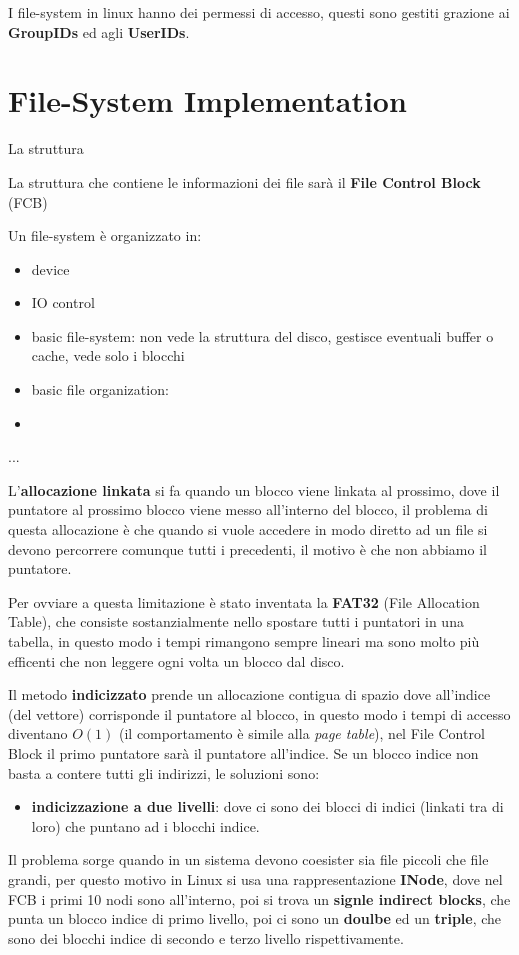 \documentclass[12pt]{article}
\begin{document}
I file-system in linux hanno dei permessi di accesso, questi sono gestiti grazione ai \textbf{GroupIDs} ed agli \textbf{UserIDs}.


\newpage
\section{File-System Implementation}
La struttura

La struttura che contiene le informazioni dei file sar\`a il \textbf{File Control Block} (FCB)

Un file-system \`e organizzato in:
\begin{itemize}
  \item device
  \item IO control
  \item basic file-system: non vede la struttura del disco, gestisce eventuali buffer o cache, vede solo i blocchi
  \item basic file organization: 
  \item 
\end{itemize}
...

L'\textbf{allocazione linkata} si fa quando un blocco viene linkata al prossimo, dove il puntatore al prossimo blocco viene messo all'interno del blocco, il problema di questa allocazione \`e che quando si vuole accedere in modo diretto ad un file si devono percorrere comunque tutti i precedenti, il motivo \`e che non abbiamo il puntatore.

Per ovviare a questa limitazione \`e stato inventata la \textbf{FAT32} (File Allocation Table), che consiste sostanzialmente nello spostare tutti i puntatori in una tabella, in questo modo i tempi rimangono sempre lineari ma sono molto pi\`u efficenti che non leggere ogni volta un blocco dal disco.

Il metodo \textbf{indicizzato} prende un allocazione contigua di spazio dove all'indice (del vettore) corrisponde il puntatore al blocco, in questo modo i tempi di accesso diventano $O(1)$ (il comportamento \`e simile alla \emph{page table}), nel File Control Block il primo puntatore sar\`a il puntatore all'indice. Se un blocco indice non basta a contere tutti gli indirizzi, le soluzioni sono:
\begin{itemize}
  \item \textbf{indicizzazione a due livelli}: dove ci sono dei blocci di indici (linkati tra di loro) che puntano ad i blocchi indice.
\end{itemize}

Il problema sorge quando in un sistema devono coesister sia file piccoli che file grandi, per questo motivo in Linux si usa una rappresentazione \textbf{INode}, dove nel FCB i primi 10 nodi sono all'interno, poi si trova un \textbf{signle indirect blocks}, che punta un blocco indice di primo livello, poi ci sono un \textbf{doulbe} ed un \textbf{triple}, che sono dei blocchi indice di secondo e terzo livello rispettivamente.
\end{document}
